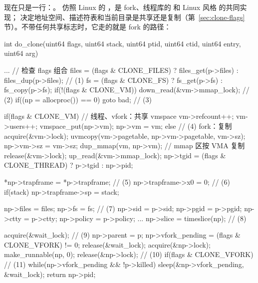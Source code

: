  现在只是一行：。 仿照 Linux 的 ，是 fork、线程库的  和 Linux 风格  的共同实现； 决定地址空间、描述符表和当前目录是共享还是复制（第~\ref{sec:clone-flags} 节）。不带任何共享标志时，它走的就是 fork 的路径：

\begin{ccode}
int do_clone(uint64 flags, uint64 stack, uint64 ptid, uint64 ctid,
             uint64 entry, uint64 arg) {
  ...                                                       // 检查 flags 组合
  files = (flags & CLONE_FILES) ? files_get(p->files) : files_dup(p->files);  // (1)
  fs    = (flags & CLONE_FS)    ? fs_get(p->fs)       : fs_copy(p->fs);
  if(!(flags & CLONE_VM))
    down_read(&vm->mmap_lock);                              // (2)
  if((np = allocproc()) == 0) goto bad;                     // (3)

  if(flags & CLONE_VM){                                     // 线程、vfork：共享 vmspace
    vm->refcount++; vm->users++;
    vmspace_put(np->vm); np->vm = vm;
  } else {                                                  // (4) fork：复制
    acquire(&vm->lock);
    uvmcopy(vm->pagetable, np->vm->pagetable, vm->sz);
    np->vm->sz = vm->sz;
    dup_mmap(vm, np->vm);                                   // mmap 区按 VMA 复制
    release(&vm->lock);
    up_read(&vm->mmap_lock);
  }
  np->tgid = (flags & CLONE_THREAD) ? p->tgid : np->pid;

  *np->trapframe = *p->trapframe;                           // (5)
  np->trapframe->x0 = 0;                                    // (6)
  if(stack) np->trapframe->sp = stack;

  np->files = files;  np->fs = fs;                          // (7)
  np->sid = p->sid;  np->pgid = p->pgid;  np->ctty = p->ctty;
  np->policy = p->policy; ... np->slice = timeslice(np);    // (8)

  acquire(&wait_lock);                                      // (9)
  np->parent = p;
  np->vfork_pending = (flags & CLONE_VFORK) != 0;
  release(&wait_lock);
  acquire(&np->lock); make_runnable(np, 0); release(&np->lock);  // (10)
  if(flags & CLONE_VFORK)                                   // (11)
    while(np->vfork_pending && !p->killed)
      sleep(&np->vfork_pending, &wait_lock);
  return np->pid;
}
\end{ccode}

